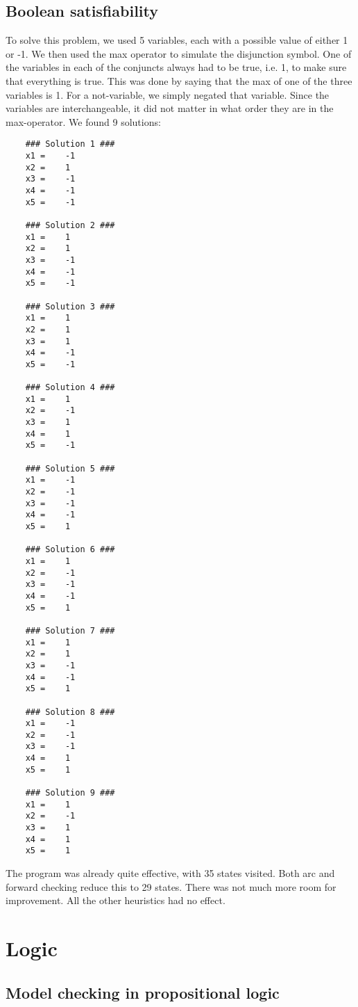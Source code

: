 \documentclass{article}
\begin{document}
	\subsection*{Boolean satisfiability}
	
	To solve this problem, we used 5 variables, each with a possible value of either 1 or -1. We then used the max operator to simulate the disjunction symbol. One of the variables in each of the conjuncts always had to be true, i.e. 1, to make sure that everything is true. This was done by saying that the max of one of the three variables is 1. For a not-variable, we simply negated that variable. Since the variables are interchangeable, it did not matter in what order they are in the max-operator. We found 9 solutions:
	
	\begin{lstlisting}
	### Solution 1 ###
	x1 = 	-1 
	x2 = 	1 
	x3 = 	-1 
	x4 = 	-1 
	x5 = 	-1 
	
	### Solution 2 ###
	x1 = 	1 
	x2 = 	1 
	x3 = 	-1 
	x4 = 	-1 
	x5 = 	-1 
	
	### Solution 3 ###
	x1 = 	1 
	x2 = 	1 
	x3 = 	1 
	x4 = 	-1 
	x5 = 	-1 
	
	### Solution 4 ###
	x1 = 	1 
	x2 = 	-1 
	x3 = 	1 
	x4 = 	1 
	x5 = 	-1 
	
	### Solution 5 ###
	x1 = 	-1 
	x2 = 	-1 
	x3 = 	-1 
	x4 = 	-1 
	x5 = 	1 
	
	### Solution 6 ###
	x1 = 	1 
	x2 = 	-1 
	x3 = 	-1 
	x4 = 	-1 
	x5 = 	1 
	
	### Solution 7 ###
	x1 = 	1 
	x2 = 	1 
	x3 = 	-1 
	x4 = 	-1 
	x5 = 	1 
	
	### Solution 8 ###
	x1 = 	-1 
	x2 = 	-1 
	x3 = 	-1 
	x4 = 	1 
	x5 = 	1 
	
	### Solution 9 ###
	x1 = 	1 
	x2 = 	-1 
	x3 = 	1 
	x4 = 	1 
	x5 = 	1 
	\end{lstlisting}
	
	The program was already quite effective, with 35 states visited. Both arc and forward checking reduce this to 29 states. There was not much more room for improvement. All the other heuristics had no effect.
	
	\section{Logic}
	\subsection*{Model checking in propositional logic}
	
\end{document}

